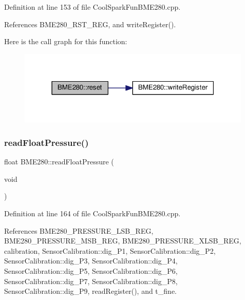 Definition at line 153 of file Cool\+Spark\+Fun\+B\+M\+E280.\+cpp.



References B\+M\+E280\+\_\+\+R\+S\+T\+\_\+\+R\+EG, and write\+Register().

Here is the call graph for this function\+:
\nopagebreak
\begin{figure}[H]
\begin{center}
\leavevmode
\includegraphics[width=316pt]{df/dcf/class_b_m_e280_aeec5deb6daace6ae390108b4210e9df7_cgraph}
\end{center}
\end{figure}
\mbox{\label{class_b_m_e280_ada6e799917afb4f228e6253bc56ffe75}} 
\subsubsection{\texorpdfstring{read\+Float\+Pressure()}{readFloatPressure()}}
{\footnotesize\ttfamily float B\+M\+E280\+::read\+Float\+Pressure (\begin{DoxyParamCaption}\item[{void}]{ }\end{DoxyParamCaption})}



Definition at line 164 of file Cool\+Spark\+Fun\+B\+M\+E280.\+cpp.



References B\+M\+E280\+\_\+\+P\+R\+E\+S\+S\+U\+R\+E\+\_\+\+L\+S\+B\+\_\+\+R\+EG, B\+M\+E280\+\_\+\+P\+R\+E\+S\+S\+U\+R\+E\+\_\+\+M\+S\+B\+\_\+\+R\+EG, B\+M\+E280\+\_\+\+P\+R\+E\+S\+S\+U\+R\+E\+\_\+\+X\+L\+S\+B\+\_\+\+R\+EG, calibration, Sensor\+Calibration\+::dig\+\_\+\+P1, Sensor\+Calibration\+::dig\+\_\+\+P2, Sensor\+Calibration\+::dig\+\_\+\+P3, Sensor\+Calibration\+::dig\+\_\+\+P4, Sensor\+Calibration\+::dig\+\_\+\+P5, Sensor\+Calibration\+::dig\+\_\+\+P6, Sensor\+Calibration\+::dig\+\_\+\+P7, Sensor\+Calibration\+::dig\+\_\+\+P8, Sensor\+Calibration\+::dig\+\_\+\+P9, read\+Register(), and t\+\_\+fine.



